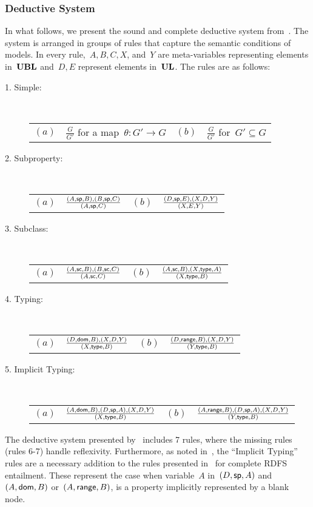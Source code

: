 \subsubsection*{Deductive System}
% 
In what follows, we present the sound and complete deductive system from~\citet{MunozPerezGutierrez:2007aa}.
%
The system is arranged in groups of rules that capture the semantic conditions of models. In every rule,~$A,B,C,X$,
and~$Y$ are meta-variables representing elements in~$\mathbf{UBL}$ and~$D,E$ represent elements in~$\mathbf{UL}$.  
%
The rules are as follows:
% 
\begin{description}
\item[1. Simple:] ~ \\[0.5em]
  \begin{tabular}{llll}
    $(a)$ & $\frac{G}{G'}$ for a map~$\theta:G' \to G$ & $(b)$ & $\frac{G}{G'}$ for~$G' \subseteq G$
  \end{tabular}
\item[2. Subproperty:] ~ \\[0.5em]
  \begin{tabular}{llll}
    $(a)$ & $\frac{(A,  \mathsf{sp}, B),  (B,  \mathsf{sp}, C)}{(A,  \mathsf{sp}, C)}$ & $(b)$ & $\frac{(D,  \mathsf{sp}, E),  (X, D, Y)}{(X, E, Y)}$
  \end{tabular}
\item[3. Subclass:] ~ \\[0.5em]
  \begin{tabular}{llll}
    $(a)$ & $\frac{(A, \mathsf{sc}, B),  (B, \mathsf{sc}, C)}{(A, \mathsf{sc}, C)}$ & $(b)$ & $\frac{(A, \mathsf{sc}, B),  (X, \mathsf{type}, A)}{(X, \mathsf{type}, B)}$
  \end{tabular}
\item[4. Typing:] ~ \\[0.5em]
  \begin{tabular}{llll}
    $(a)$ & $\frac{(D, \mathsf{dom}, B),  (X, D, Y)}{(X, \mathsf{type}, B)}$ & $(b)$ & $\frac{(D, \mathsf{range}, B),  (X, D, Y)}{(Y, \mathsf{type}, B)}$
  \end{tabular}
\item[5. Implicit Typing:] ~ \\[0.5em]
  \begin{tabular}{llll}
    $(a)$ & $\frac{(A, \mathsf{dom}, B),  (D,  \mathsf{sp}, A), (X, D, Y)}{(X, \mathsf{type}, B)}$  &
    $(b)$ & $\frac{(A, \mathsf{range}, B),  (D,  \mathsf{sp}, A), (X, D, Y)}{(Y, \mathsf{type}, B)}$
  \end{tabular}
\end{description}
%
The deductive system presented by~\citet{MunozPerezGutierrez:2007aa} includes 7 rules, where the missing rules (rules
6-7) handle reflexivity.  
%
Furthermore, as noted in~\citet{MunozPerezGutierrez:2007aa}, the ``Implicit Typing'' rules are a necessary addition to
the rules presented in~\citet{Hayes:2004aa} for complete \ac{RDFS} entailment.  These represent the case when variable~$A$
in~$(D, \mathsf{sp}, A)$ and~$(A, \mathsf{dom}, B)$ or~$(A, \mathsf{range}, B)$, is a property implicitly represented by
a blank node.

